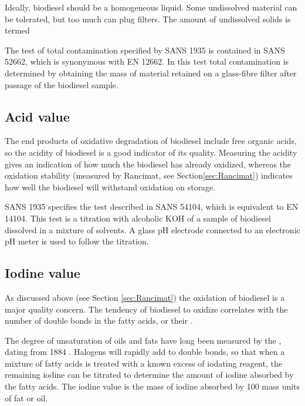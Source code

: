Ideally, biodiesel should be a homogeneous liquid. Some undissolved material can
be tolerated, but too much can plug filters. The amount of undissolved solids is
termed 

The test of total contamination specified by SANS 1935 is contained in SANS
52662, which is synonymous with EN 12662. In this test total contamination is
determined by obtaining the mass of material retained on a glass-fibre filter
after passage of the biodiesel sample.

\subsection{Acid value}

The end products of oxidative degradation of biodiesel include free organic acids, so the
acidity of biodiesel is a good indicator of its quality. Measuring the acidity
gives an indication of how much the biodiesel has already oxidized, whereas the
oxidation stability (measured by Rancimat, see Section\ref{sec:Rancimat})
indicates how well the biodiesel will withstand oxidation on storage.

SANS 1935 specifies the test described in SANS 54104, which is equivalent to EN
14104. This test is a titration with alcoholic KOH of a sample of biodiesel
dissolved in a mixture of solvents. A glass pH electrode connected to an
electronic pH meter is used to follow the titration.

\subsection{Iodine value}

As discussed above (see Section \ref{sec:Rancimat}) the oxidation of biodiesel
is a major quality concern. The tendency of biodiesel to oxidize correlates with
the number of double bonds in the fatty acids, or their .


The degree of unsaturation of oils and fats have long been measured by the
, dating from 1884 \autocite{Knothe2007}. Halogens will
rapidly add to double bonds, so that when a mixture of fatty acids is treated
with a known excess of iodating reagent, the remaining iodine can be titrated to
determine the amount of iodine absorbed by the fatty acids. The iodine value is
the mass of iodine absorbed by 100 mass units of fat or oil.

